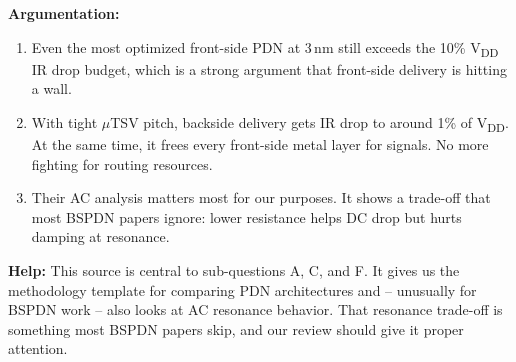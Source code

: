 \documentclass[conference,a4paper]{IEEEtran}
\begin{document}
\textbf{Argumentation:}
\begin{enumerate}
    \item Even the most optimized front-side PDN at 3\,nm still exceeds the 10\% V\textsubscript{DD} IR drop budget, which is a strong argument that front-side delivery is hitting a wall.
    \item With tight $\mu$TSV pitch, backside delivery gets IR drop to around 1\% of V\textsubscript{DD}. At the same time, it frees every front-side metal layer for signals. No more fighting for routing resources.
    \item Their AC analysis matters most for our purposes. It shows a trade-off that most BSPDN papers ignore: lower resistance helps DC drop but hurts damping at resonance.
\end{enumerate}

\textbf{Help:} This source is central to sub-questions A, C, and F. It gives us the methodology template for comparing PDN architectures and -- unusually for BSPDN work -- also looks at AC resonance behavior. That resonance trade-off is something most BSPDN papers skip, and our review should give it proper attention.
\end{document}
